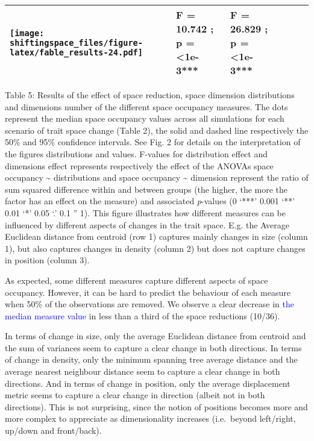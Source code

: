 \documentclass[]{article}
\begin{document}
\begin{longtable}[]{@{}llllll@{}}
\begin{minipage}[t]{0.13\columnwidth}
\texttt{[image: shiftingspace\_files/figure-latex/fable\_results-24.pdf]}\strut
\end{minipage} & \begin{minipage}[t]{0.17\columnwidth}\raggedright\strut
F = 10.742 ; p = \textless{}1e-3***\strut
\end{minipage} & \begin{minipage}[t]{0.16\columnwidth}\raggedright\strut
F = 26.829 ; p = \textless{}1e-3***\strut
\end{minipage}\tabularnewline
\bottomrule
\end{longtable}

Table 5: Results of the effect of space reduction, space dimension
distributions and dimensions number of the different space occupancy
measures. The dots represent the median space occupancy values across
all simulations for each scenario of trait space change (Table 2), the
solid and dashed line respectively the 50\% and 95\% confidence
intervals. See Fig. 2 for details on the interpretation of the figures
distributions and values. F-values for distribution effect and
dimensions effect represents respectively the effect of the ANOVAs space
occupancy \textasciitilde{} distributions and space occupancy
\textasciitilde{} dimension represent the ratio of sum squared
difference within and between groups (the higher, the more the factor
has an effect on the measure) and associated \emph{p}-values (0 `***'
0.001 `**' 0.01 `*' 0.05 `.' 0.1 '' 1). This figure illustrates how
different measures can be influenced by different aspects of changes in
the trait space. E.g. the Average Euclidean distance from centroid (row
1) captures mainly changes in size (column 1), but also captures changes
in density (column 2) but does not capture changes in position (column
3).

\renewcommand\baselinestretch{1.6}\selectfont

As expected, some different measures capture different aspects of space
occupancy. However, it can be hard to predict the behaviour of each
measure when 50\% of the observations are removed. We observe a clear
decrease in \textcolor{blue}{the median measure
value} in less than a third of the space reductions (10/36).

In terms of change in size, only the average Euclidean distance from
centroid and the sum of variances seem to capture a clear change in both
directions. In terms of change in density, only the minimum spanning
tree average distance and the average nearest neighbour distance seem to
capture a clear change in both directions. And in terms of change in
position, only the average displacement metric seems to capture a clear
change in direction (albeit not in both directions). This is not
surprising, since the notion of positions becomes more and more complex
to appreciate as dimensionality increases (i.e.~beyond left/right,
up/down and front/back).
\end{document}
